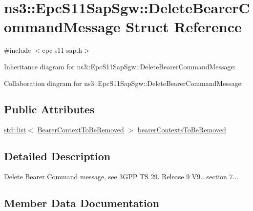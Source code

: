 \hypertarget{structns3_1_1EpcS11SapSgw_1_1DeleteBearerCommandMessage}{}\section{ns3\+:\+:Epc\+S11\+Sap\+Sgw\+:\+:Delete\+Bearer\+Command\+Message Struct Reference}
\label{structns3_1_1EpcS11SapSgw_1_1DeleteBearerCommandMessage}


{\ttfamily \#include $<$epc-\/s11-\/sap.\+h$>$}



Inheritance diagram for ns3\+:\+:Epc\+S11\+Sap\+Sgw\+:\+:Delete\+Bearer\+Command\+Message\+:


Collaboration diagram for ns3\+:\+:Epc\+S11\+Sap\+Sgw\+:\+:Delete\+Bearer\+Command\+Message\+:
\subsection*{Public Attributes}
\begin{DoxyCompactItemize}
\item 
\hyperlink{openflow-interface_8h_afd9bcfa176617760671b67580f536fa7}{std\+::list}$<$ \hyperlink{structns3_1_1EpcS11SapSgw_1_1BearerContextToBeRemoved}{Bearer\+Context\+To\+Be\+Removed} $>$ \hyperlink{structns3_1_1EpcS11SapSgw_1_1DeleteBearerCommandMessage_a8b4172d2e75df07ce0d9680cb38e84a5}{bearer\+Contexts\+To\+Be\+Removed}
\end{DoxyCompactItemize}


\subsection{Detailed Description}
Delete Bearer Command message, see 3\+G\+PP TS 29. Release 9 V9.. section 7... 

\subsection{Member Data Documentation}
